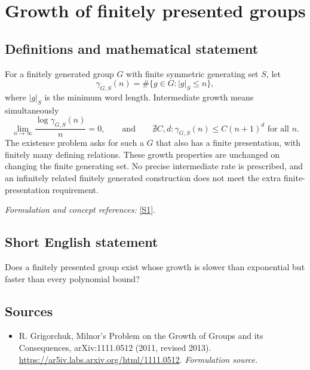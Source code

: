 \documentclass[11pt]{article}
\begin{document}
\section*{\texorpdfstring{Growth of finitely presented groups}{Growth of finitely presented groups}}\label{3329}
\subsection{Definitions and mathematical statement}
For a finitely generated group $G$ with finite symmetric generating set $S$, let
\[
 \gamma_{G,S}(n)=\#\{g\in G:|g|_S\le n\},
\]
where $|g|_S$ is the minimum word length. Intermediate growth means simultaneously
\[
 \lim_{n\to\infty}\frac{\log\gamma_{G,S}(n)}n=0,
 \qquad\text{and}\qquad
 \nexists C,d:\gamma_{G,S}(n)\le C(n+1)^d\text{ for all }n.
\]
The existence problem asks for such a $G$ that also has a finite presentation, with finitely many defining relations. These growth properties are unchanged on changing the finite generating set. No precise intermediate rate is prescribed, and an infinitely related finitely generated construction does not meet the extra finite-presentation requirement.
\par\smallskip\textit{Formulation and concept references:} \href{https://ar5iv.labs.arxiv.org/html/1111.0512}{[S1]}.

\subsection{Short English statement}
Does a finitely presented group exist whose growth is slower than exponential but faster than every polynomial bound?
\subsection{Sources}
\begin{itemize}
\item[S1]R. Grigorchuk, Milnor's Problem on the Growth of Groups and its Consequences, arXiv:1111.0512 (2011, revised 2013).
\url{https://ar5iv.labs.arxiv.org/html/1111.0512}.
\textit{Formulation source.}
\end{itemize}
\end{document}
